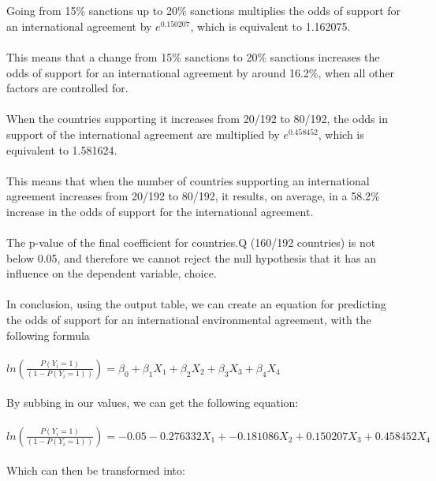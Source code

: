\documentclass[12pt,letterpaper]{article}
\begin{document}
\noindent
\\\\
Going from 15\% sanctions up to 20\% sanctions multiplies the odds of support for an international agreement by $e^0.150207$, which is equivalent to 1.162075.
\\\\
\noindent 
This means that a change from 15\% sanctions to 20\% sanctions increases the odds of support for an international agreement by around 16.2\%, when all other factors are controlled for.
\\\\
\noindent
When the countries supporting it increases from 20/192 to 80/192, the odds in support of the international agreement are multiplied by $e^0.458452$, which is equivalent to 1.581624.
\\\\
\noindent 
This means that when the number of countries supporting an international agreement increases from 20/192 to 80/192, it results, on average, in a 58.2\% increase in the odds of support for the international agreement.
\\\\
\noindent
The p-value of the final coefficient for countries.Q (160/192 countries) is not below 0.05, and therefore we cannot reject the null hypothesis that it has an influence on the dependent variable, choice.
\\\\

\noindent
In conclusion, using the output table, we can create an equation for predicting the odds of support for an international environmental agreement, with the following formula
\\\\
$ ln(\frac{P(Y_i = 1)}{(1 - P(Y_i = 1))}) = \beta_0 + \beta_1X_1 + \beta_2X_2 + \beta_3X_3 + \beta_4X_4$
\\\\

\noindent By subbing in our values, we can get the following equation:
\\\\
$ ln(\frac{P(Y_i = 1)}{(1 - P(Y_i = 1))}) = -0.05 -0.276332X_1 + -0.181086X_2 + 0.150207X_3 + 0.458452X_4$
\\\\

\noindent Which can then be transformed into:
\\\\
\end{document}

